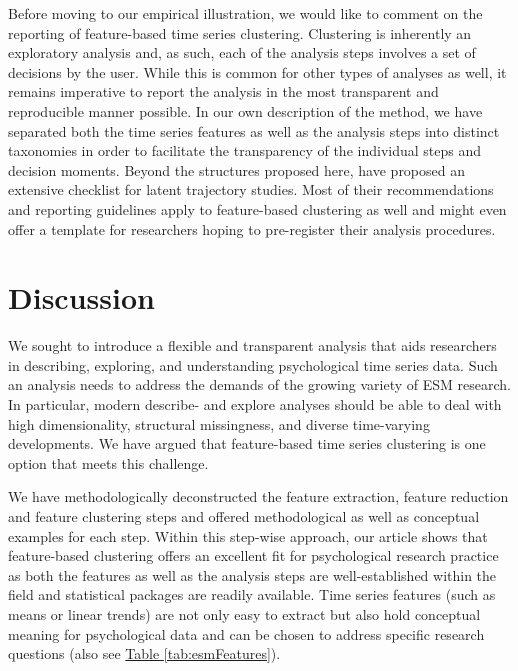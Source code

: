 \documentclass[man, 12pt, a4paper, mask, floatsintext]{apa7}
\theoremstyle{break}
\theoremstyle{plain}
\newcommand{\tblref}[2][]{\hyperref[#2]{Table \ref*{#2}#1}}
\begin{document}
Before moving to our empirical illustration, we would like to comment on the reporting of feature-based time series clustering. Clustering is inherently an exploratory analysis and, as such, each of the analysis steps involves a set of decisions by the user. While this is common for other types of analyses as well, it remains imperative to report the analysis in the most transparent and reproducible manner possible. In our own description of the method, we have separated both the time series features as well as the analysis steps into distinct taxonomies in order to facilitate the transparency of the individual steps and decision moments. Beyond the structures proposed here, \citet{vandeschoot2017} have proposed an extensive checklist for latent trajectory studies. Most of their recommendations and reporting guidelines apply to feature-based clustering as well and might even offer a template for researchers hoping to pre-register their analysis procedures.


% 
%

\section{Discussion}
We sought to introduce a flexible and transparent analysis that aids researchers in describing, exploring, and understanding psychological time series data. Such an analysis needs to address the demands of the growing variety of ESM research. In particular, modern describe- and explore analyses should be able to deal with high dimensionality, structural missingness, and diverse time-varying developments. We have argued that feature-based time series clustering is one option that meets this challenge. 

We have methodologically deconstructed the feature extraction, feature reduction and feature clustering steps and offered methodological as well as conceptual examples for each step. Within this step-wise approach, our article shows that feature-based clustering offers an excellent fit for psychological research practice as both the features as well as the analysis steps are well-established within the field and statistical packages are readily available. Time series features (such as means or linear trends) are not only easy to extract but also hold conceptual meaning for psychological data and can be chosen to address specific research questions (also see \tblref{tab:esmFeatures}). 
\end{document}
